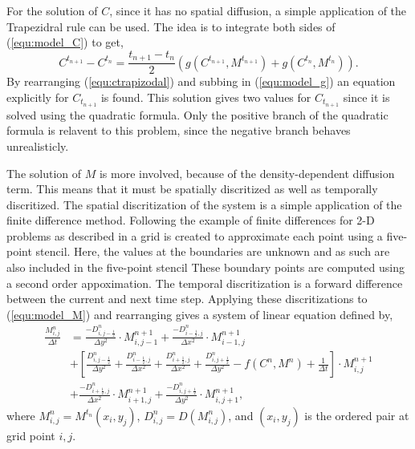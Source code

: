 \documentclass{llncs}
\begin{document}
  For the solution of $C$, since it has no spatial diffusion, a simple application of the Trapezidral rule can be used.
  The idea is to integrate both sides of (\ref{equ:model_C}) to get,
  \begin{equation} \label{equ:ctrapizodal}
    C^{t_{n+1}} - C^{t_n} = \frac{t_{n+1} - t_{n}}{2} \left( g(C^{t_{n+1}}, M^{t_{n+1}}) + g(C^{t_n}, M^{t_n}) \right).
  \end{equation}
  By rearranging (\ref{equ:ctrapizodal}) and subbing in (\ref{equ:model_g}) an equation explicitly for $C_{t_{n+1}}$ is found.
  This solution gives two values for $C_{t_{n+1}}$ since it is solved using the quadratic formula.
  Only the positive branch of the quadratic formula is relavent to this problem, since the negative branch behaves unrealisticly.
  
  The solution of $M$ is more involved, because of the density-dependent diffusion term.
  This means that it must be spatially discritized as well as temporally discritized. 
  The spatial discritization of the system is a simple application of the finite difference method.
  Following the example of finite differences for 2-D problems as described in \cite{saad2003iterativeMethod} a grid is created to approximate each point using a five-point stencil.
  Here, the values at the boundaries are unknown and as such are also included in the five-point stencil
  These boundary points are computed using a second order appoximation.
  The temporal discritization is a forward difference between the current and next time step.
  Applying these discritizations to (\ref{equ:model_M}) and rearranging gives a system of linear equation defined by,
  \begin{equation} \label{equ:discritizeM}
  \begin{aligned}
    \frac{M^n_{i,j}}{\Delta t} &= \frac{-D^n_{i,j-\frac{1}{2}}}{\Delta y ^2} \cdot M^{n+1}_{i,j-1} + \frac{-D^n_{i-\frac{1}{2},j}}{\Delta x ^2} \cdot M^{n+1}_{i-1,j}  \\
    &  +  \left[ \frac{D^n_{i,j-\frac{1}{2}}}{\Delta y ^2} + \frac{D^n_{i-\frac{1}{2},j}}{\Delta x ^2} + \frac{D^n_{i+\frac{1}{2},j}}{\Delta x ^2} + \frac{D^n_{i,j+\frac{1}{2}}}{\Delta y ^2} - f(C^n, M^n) + \frac{1}{\Delta t} \right] \cdot M^{n+1}_{i,j}  \\
    &  + \frac{-D^n_{i+\frac{1}{2},j}}{\Delta x ^2} \cdot M^{n+1}_{i+1,j} + \frac{-D^n_{i,j+\frac{1}{2}}}{\Delta y ^2} \cdot M^{n+1}_{i,j+1},
  \end{aligned}
  \end{equation} 
  where $M^n_{i,j} = M^{t_n}(x_i,y_j)$, $D^n_{i,j} = D(M^n_{i,j})$, and $(x_i,y_j)$ is the ordered pair at grid point $i,j$.
  
\end{document}

